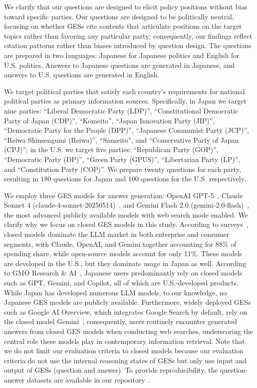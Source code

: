 We clarify that our questions are designed to elicit policy positions without bias toward specific parties.
Our questions are designed to be politically neutral, focusing on whether GESs cite contents that articulate positions on the target topics rather than favoring any particular party; consequently, our findings reflect citation patterns rather than biases introduced by question design.
The questions are prepared in two languages: Japanese for Japanese politics and English for U.S. politics.
Answers to Japanese questions are generated in Japanese, and answers to U.S. questions are generated in English.

We target political parties that satisfy each country's requirements for national political parties as primary information sources.
Specifically, in Japan we target nine parties: ``Liberal Democratic Party (LDP)'', ``Constitutional Democratic Party of Japan (CDP)'', ``Komeito'', ``Japan Innovation Party (JIP)'', ``Democratic Party for the People (DPP)'', ``Japanese Communist Party (JCP)'', ``Reiwa Shinsengumi (Reiwa)'', ``Sanseito'', and ``Conservative Party of Japan (CPJ)''; in the U.S. we target five parties: ``Republican Party (GOP)'', ``Democratic Party (DP)'', ``Green Party (GPUS)'', ``Libertarian Party (LP)'', and ``Constitution Party (COP)''.
We prepare twenty questions for each party, resulting in \(180\) questions for Japan and \(100\) questions for the U.S. respectively.

We employ three GES models for answer generation: OpenAI GPT-5~\cite{chatgpt}, Claude Sonnet \(4\) (claude-4-sonnet-20250514)~\cite{claude}, and Gemini Flash \(2.0\) (gemini-2.0-flash)~\cite{gemini}, the most advanced publicly available models with web search mode enabled.
We clarify why we focus on closed GES models in this study.
According to surveys~\cite{menlo-ventures2025stategenaienterprise, a16z2025stateconsumerai}, closed models dominate the LLM market in both enterprise and consumer segments, with Claude, OpenAI, and Gemini together accounting for 88\% of spending share, while open-source models account for only 11\%.
These models are developed in the U.S., but they dominate usage in Japan as well.
According to GMO Research \& AI~\cite{gmo-research2025japanai}, Japanese users predominantly rely on closed models such as GPT, Gemini, and Copilot, all of which are U.S.-developed products.
While Japan has developed numerous LLM models, to our knowledge, no Japanese GES models are publicly available.
Furthermore, widely deployed GESs such as Google AI Overview, which integrates Google Search by default, rely on the closed model Gemini~\cite{stein2025expandingaioverviewsaimode, reid2025aisearchbeyondinformation}; consequently, users routinely encounter generated answers from closed GES models when conducting web searches, underscoring the central role these models play in contemporary information retrieval.
Note that we do not limit our evaluation criteria to closed models because our evaluation criteria do not use the internal reasoning states of GESs but only use input and output of GESs (question and answer).
To provide reproducibility, the question-answer datasets are available in our repository~\cite{QL_CIKM_RERO}.

